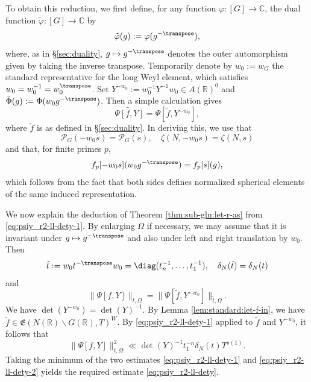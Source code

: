 To obtain this reduction, we first define, for any function $\varphi : [G] \rightarrow \mathbb{C}$, the dual function $\tilde{\varphi} : [G] \rightarrow \mathbb{C}$ by
\begin{equation*}
  \tilde{\varphi}(g) := \varphi(g^{-\transpose}),
\end{equation*}
where, as in \S\ref{sec:duality}, $g \mapsto g^{-\transpose}$ denotes the outer automorphism given by taking the inverse transpose.  Temporarily denote by $w_0 := w_G$ the standard representative for the long Weyl element, which satisfies $w_0 = w_0^{-1} = w_0^\transpose$.  Set $Y^{-w_0} := w_0^{-1} Y^{-1} w_0 \in A(\mathbb{R})^0$ and $\tilde{\Phi}(g) := \Phi(w_0 g^{-\transpose})$.  Then a simple calculation gives
\begin{equation*}
  \widetilde{\Psi[f,Y]} = \Psi[\tilde{f}, Y^{-w_0}],
\end{equation*}
where $\tilde{f}$ is as defined in \S\ref{sec:duality}.  In deriving this, we use that
\begin{equation*}
  \mathcal{P}_G(-w_0 s) = \mathcal{P}_G(s),
  \quad
  \zeta(N,-w_0 s) = \zeta(N,s)
\end{equation*}
and that, for finite primes $p$,
\begin{equation*}
  f_p[-w_0 s](w_0 g^{-\transpose}) = f_p[s](g),
\end{equation*}
which follows from the fact that both sides defines normalized spherical elements of the same induced representation.

We now explain the deduction of Theorem \ref{thm:sub-gln:let-r-as} from \eqref{eq:psiy_r2-ll-dety-1}.  By enlarging $\Omega$ if necessary, we may assume that it is invariant under $g \mapsto g^{-\transpose}$ and also under left and right translation by $w_0$.  Then
\begin{equation*}
  \tilde{t} := w_0 t^{-\transpose} w_0 = \diag(t_n^{-1}, \dotsc, t_1^{-1}),
  \quad
  \delta_N(\tilde{t}) = \delta_N(t)
\end{equation*}
and
\begin{equation*}
  \|\Psi[f,Y]\|_{t,\Omega} = \|\Psi[\tilde{f}, Y^{-w_0}]\|_{\tilde{t},\Omega}.
\end{equation*}
We have $\det(Y^{-w_0}) = \det(Y)^{-1}$.  By Lemma \ref{lem:standard:let-f-in}, we have $\tilde{f} \in \mathfrak{E}(N(\mathbb{R}) \backslash G(\mathbb{R}), T)^W$.  By \eqref{eq:psiy_r2-ll-dety-1} applied to $\tilde{f}$ and $Y^{-w_0}$, it follows that
\begin{equation}\label{eq:psiy_r2-ll-dety-2}
  \|\Psi[f,Y]\|_{t,\Omega}^2 \ll
  \det(Y)^{-1} t_1^{-n} \delta_N(t) T^{o(1)}.
\end{equation}
Taking the minimum of the two estimates \eqref{eq:psiy_r2-ll-dety-1} and \eqref{eq:psiy_r2-ll-dety-2} yields the required estimate \eqref{eq:psiy_r2-ll-dety}.




